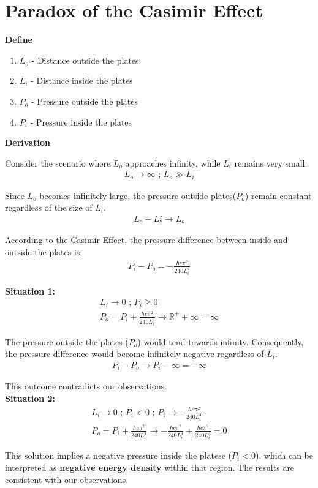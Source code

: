 \section{Paradox of the Casimir Effect}

\noindent\textbf{Define}
\begin{enumerate}
    \item \(L_o\) - Distance outside the plates
    \item \(L_i\) - Distance inside the plates
    \item \(P_o\) - Pressure outside the plates
    \item \(P_i\) - Pressure inside the plates
\end{enumerate}

\noindent\textbf{Derivation}


Consider the scenario where  $L_o$ approaches infinity, while $L_i$ remains very small.
\begin{align}
    L_o \rightarrow \infty\text{ ;  } L_o \gg L_i
\end{align}

Since $L_o$ becomes infinitely large, the pressure outside plates($P_o$) remain constant regardless of the size of $L_i$.
\begin{align}L_o - Li \rightarrow L_o\end{align}

According to the Casimir Effect\citep*{Casimir:1948dh}, the pressure difference between inside and outside the plates is:
\begin{align}P_i - P_o = -\frac{\hbar c \pi^2}{240 L_i^4}\end{align}


\noindent\textbf{Situation 1:}
\begin{align}
    &L_i \rightarrow 0\text{ ;  } P_i \ge 0& \\
    &P_o = P_i + \frac{\hbar c \pi^2}{240 L_i^4} \rightarrow {\mathbb{R}}^+ + \infty = \infty&
\end{align}

The pressure outside the plates ($P_o$) would tend towards infinity.
Consequently, the pressure difference would become infinitely negative regardless of $L_i$.
\begin{align}P_i - P_o \rightarrow P_i - \infty = - \infty\end{align}

This outcome contradicts our observations.\\

\noindent\textbf{Situation 2:}
\begin{align}
    &L_i \rightarrow 0\text{ ;  } P_i < 0 \text{ ;  } P_i \rightarrow -\frac{\hbar c \pi^2}{240 L_i^4}&\\
    &P_o = P_i + \frac{\hbar c \pi^2}{240 L_i^4} \rightarrow -\frac{\hbar c \pi^2}{240 L_i^4} + \frac{\hbar c \pi^2}{240 L_i^4} = 0
\end{align}

This solution implies a negative pressure inside the platese ($P_i < 0$), which can be interpreted as \textbf{negative energy density} within that region.
The results are consistent with our observations.